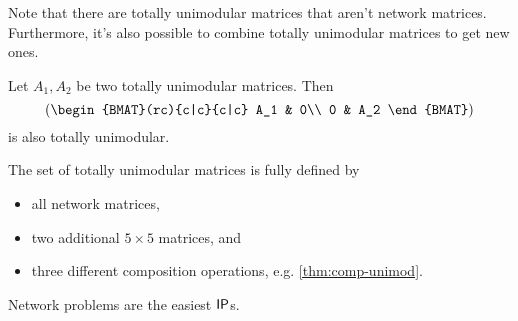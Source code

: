 Note that there are totally unimodular matrices that aren't network matrices.
Furthermore, it's also possible to combine totally unimodular matrices to get new ones.
\begin{theorem}
    Let $A_1,A_2$ be two totally unimodular matrices. Then
    \[
        \left(
        \begin{BMAT}(rc){c|c}{c|c}
                A_1 & 0\\
                0 & A_2
            \end{BMAT}
        \right)
    \]
    is also totally unimodular. \label{thm:comp-unimod}
\end{theorem}
\begin{theorem}[Seymour]
    The set of totally unimodular matrices is fully defined by
    \begin{itemize}
        \item all network matrices,
        \item two additional $5\times 5$ matrices, and
        \item three different composition operations, e.g. \autoref{thm:comp-unimod}.
    \end{itemize}
\end{theorem}
\begin{conclusion}
    Network problems are the easiest $\mathsf{IP}$s.
\end{conclusion}
